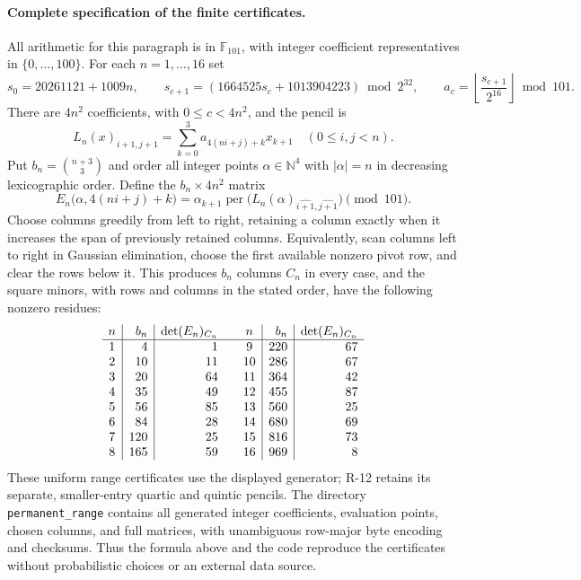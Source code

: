 \documentclass[11pt,a4paper]{article}
\theoremstyle{definition}\newtheorem{definition}{Definition}
\begin{document}
\paragraph{Complete specification of the finite certificates.}
All arithmetic for this paragraph is in $\mathbb F_{101}$, with
integer coefficient representatives in $\{0,\ldots,100\}$.
For each $n=1,\ldots,16$ set
\[
 s_0=20261121+1009n,\qquad
 s_{c+1}=(1664525s_c+1013904223)\bmod2^{32},\qquad
 a_c=\left\lfloor\frac{s_{c+1}}{2^{16}}\right\rfloor\bmod101.
\]
There are $4n^2$ coefficients, with $0\leq c<4n^2$, and the
pencil is
\[
 L_n(x)_{i+1,j+1}=\sum_{k=0}^3a_{4(ni+j)+k}x_{k+1}
 \quad(0\leq i,j<n).
\]
Put $b_n=\binom{n+3}{3}$ and order all integer points
$\alpha\in\mathbb N^4$ with $|\alpha|=n$ in decreasing
lexicographic order. Define the $b_n\times4n^2$ matrix
\begin{equation}\label{R13:evaluationmatrix}
 E_n\bigl(\alpha,4(ni+j)+k\bigr)
 =\alpha_{k+1}\operatorname{per}
   \bigl(L_n(\alpha)_{\widehat{i+1},\widehat{j+1}}\bigr)
 \pmod{101}.
\end{equation}
Choose columns greedily from left to right, retaining a column
exactly when it increases the span of previously retained columns.
Equivalently, scan columns left to right in Gaussian elimination,
choose the first available nonzero pivot row, and clear the rows
below it. This produces $b_n$ columns $C_n$ in every case, and the
square minors, with rows and columns in the stated order, have
the following nonzero residues:
\[
\begin{array}{c|r|r@{\qquad}c|r|r}
n&b_n&\det(E_n)_{C_n}&n&b_n&\det(E_n)_{C_n}\\\hline
1&4&1&9&220&67\\
2&10&11&10&286&67\\
3&20&64&11&364&42\\
4&35&49&12&455&87\\
5&56&85&13&560&25\\
6&84&28&14&680&69\\
7&120&25&15&816&73\\
8&165&59&16&969&8
\end{array}
\]
These uniform range certificates use the displayed generator;
R-12 retains its separate, smaller-entry quartic and quintic pencils.
The directory \texttt{permanent\_range} contains all generated
integer coefficients, evaluation points, chosen columns, and full
matrices, with unambiguous row-major byte encoding and checksums.
Thus the formula above and the code reproduce the certificates
without probabilistic choices or an external data source.
\end{document}
